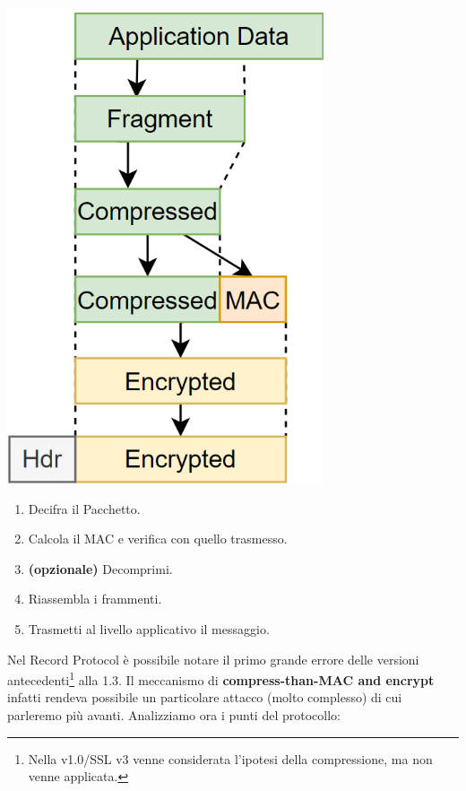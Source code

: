 \begin{minipage}{0.4\textwidth}\vspace{4pt}
\centering
\captionsetup{type=figure}\includegraphics[width=0.7\textwidth]{image/tlsrecord.png}
\label{fig:tlsrecord}
\end{minipage}
\begin{theorem}\label{thm:recordprotocolrcv}
\begin{enumerate}
    \item Decifra il Pacchetto.
    \item Calcola il MAC e verifica con quello trasmesso.
    \item \textbf{(opzionale)} Decomprimi.
    \item Riassembla i frammenti.
    \item Trasmetti al livello applicativo il messaggio.
\end{enumerate}
\end{theorem}
Nel Record Protocol è possibile notare il primo grande errore delle versioni antecedenti\footnote{Nella v1.0/SSL v3 venne considerata l'ipotesi della compressione, ma non venne applicata.} alla 1.3. Il meccanismo di \textbf{compress-than-MAC and encrypt} infatti rendeva possibile un particolare attacco (molto complesso) di cui parleremo più avanti. Analizziamo ora i punti del protocollo:

